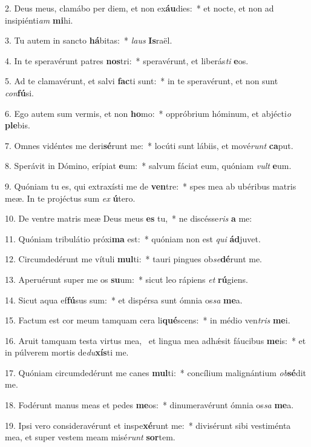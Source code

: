 2. Deus meus, clamábo per diem, et non ex\textbf{áu}dies:~*  et nocte, et non ad insipiénti\textit{am} \textbf{mi}hi.\

3. Tu autem in sancto \textbf{há}bitas:~*  \textit{laus} \textbf{Is}raël.\

4. In te speravérunt patres \textbf{nos}tri:~*  speravérunt, et liberás\textit{ti} \textbf{e}os.\

5. Ad te clamavérunt, et salvi \textbf{fac}ti sunt:~*  in te speravérunt, et non sunt \textit{con}\textbf{fú}si.\

6. Ego autem sum vermis, et non \textbf{ho}mo:~*  oppróbrium hóminum, et abjécti\textit{o} \textbf{ple}bis.\

7. Omnes vidéntes me deri\textbf{sé}runt me:~*  locúti sunt lábiis, et mové\textit{runt} \textbf{ca}put.\

8. Sperávit in Dómino, erípiat \textbf{e}um:~*  salvum fáciat eum, quóniam \textit{vult} \textbf{e}um.\

9. Quóniam tu es, qui extraxísti me de \textbf{ven}tre:~*  spes mea ab ubéribus matris meæ. In te projéctus sum \textit{ex} \textbf{ú}tero.\

10. De ventre matris meæ Deus meus \textbf{es} tu,~*  ne discésse\textit{ris} \textbf{a} me:\

11. Quóniam tribulátio próxi\textbf{ma} est:~*  quóniam non est \textit{qui} \textbf{ád}juvet.\

12. Circumdedérunt me vítuli \textbf{mul}ti:~*  tauri pingues ob\textit{se}\textbf{dé}runt me.\

13. Aperuérunt super me os \textbf{su}um:~*  sicut leo rápiens \textit{et} \textbf{rú}giens.\

14. Sicut aqua ef\textbf{fú}sus sum:~*  et dispérsa sunt ómnia os\textit{sa} \textbf{me}a.\

15. Factum est cor meum tamquam cera li\textbf{qué}scens:~*  in médio ven\textit{tris} \textbf{me}i.\

16. Aruit tamquam testa virtus mea, \dag\  et lingua mea adhǽsit fáucibus \textbf{me}is:~*  et in púlverem mortis de\textit{du}\textbf{xís}ti me.\

17. Quóniam circumdedérunt me canes \textbf{mul}ti:~*  concílium malignántium \textit{ob}\textbf{sé}dit me.\

18. Fodérunt manus meas et pedes \textbf{me}os:~*  dinumeravérunt ómnia os\textit{sa} \textbf{me}a.\

19. Ipsi vero consideravérunt et inspe\textbf{xé}runt me:~*  divisérunt sibi vestiménta mea, et super vestem meam misé\textit{runt} \textbf{sor}tem.\

